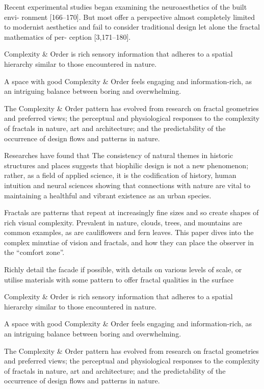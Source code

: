 Recent experimental studies began examining the neuroaesthetics of the built envi-
ronment [166–170]. But most offer a perspective almost completely limited to modernist
aesthetics and fail to consider traditional design let alone the fractal mathematics of per-
ception [3,171–180]. \cite{Brielmann2022}


Complexity & Order is rich sensory information that adheres to a spatial hierarchy similar to those encountered in nature. \cite{Browning2014}

A space with good Complexity & Order feels engaging and information-rich, as an intriguing balance between boring and overwhelming.\cite{Browning2014}

The Complexity & Order pattern has evolved from research on fractal geometries and preferred views; the perceptual and physiological responses to the complexity of fractals in nature, art and architecture; and the predictability of the occurrence of design flows and patterns in nature.\cite{Browning2014}


Researches have found that
The consistency of natural themes in historic structures and places suggests that
biophilic design is not a new phenomenon; rather, as a field of applied science,
it is the codification of history, human intuition and neural sciences showing that
connections with nature are vital to maintaining a healthful and vibrant existence
as an urban species.\cite{Browning2014}

Fractals are patterns that repeat at increasingly fine sizes and so create shapes of rich visual complexity.
Prevalent in nature, clouds, trees, and mountains are common examples, as are cauliﬂowers and fern leaves.
This paper dives into the complex minutiae of vision and fractals, and how they can place the observer in the “comfort zone”.\cite{Browning2014}

Richly detail the facade if possible, with details on various levels of scale, or utilise materials with some pattern to offer fractal qualities in the surface\cite{Aesthetic2022}

Complexity & Order is rich sensory information that adheres to a spatial hierarchy similar to those encountered in nature. \cite{Browning2014}

A space with good Complexity & Order feels engaging and information-rich, as an intriguing balance between boring and overwhelming.\cite{Browning2014}

The Complexity & Order pattern has evolved from research on fractal geometries and preferred views; the perceptual and physiological responses to the complexity of fractals in nature, art and architecture; and the predictability of the occurrence of design flows and patterns in nature.\cite{Browning2014}

